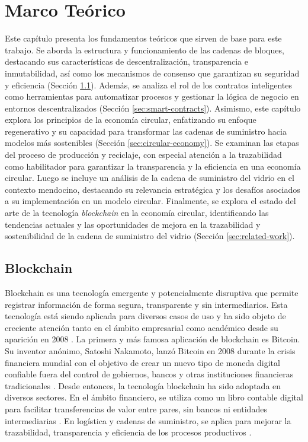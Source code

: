 \chapter[Marco Teórico]{Marco Teórico}
\label{cp:theoretical-framework}

\parindent0pt


Este capítulo presenta los fundamentos teóricos que sirven de base para este trabajo. Se aborda la estructura y funcionamiento de las cadenas de bloques, destacando sus características de descentralización, transparencia e inmutabilidad, así como los mecanismos de consenso que garantizan su seguridad y eficiencia (Sección \ref{sec:blockchain}). Además, se analiza el rol de los contratos inteligentes como herramientas para automatizar procesos y gestionar la lógica de negocio en entornos descentralizados (Sección \ref{sec:smart-contracts}). Asimismo, este capítulo explora los principios de la economía circular, enfatizando su enfoque regenerativo y su capacidad para transformar las cadenas de suministro hacia modelos más sostenibles (Sección \ref{sec:circular-economy}). Se examinan las etapas del proceso de producción y reciclaje, con especial atención a la trazabilidad como habilitador para garantizar la transparencia y la eficiencia en una economía circular. Luego se incluye un análisis de la cadena de suministro del vidrio en el contexto mendocino, destacando su relevancia estratégica y los desafíos asociados a su implementación en un modelo circular. Finalmente, se explora el estado del arte de la tecnología \textit{blockchain} en la economía circular, identificando las tendencias actuales y las oportunidades de mejora en la trazabilidad y sostenibilidad de la cadena de suministro del vidrio (Sección \ref{sec:related-work}).

\section{Blockchain}
\label{sec:blockchain}

Blockchain es una tecnología emergente y potencialmente disruptiva que permite registrar información de forma segura, transparente y sin intermediarios. Esta tecnología está siendo aplicada para diversos casos de uso y ha sido objeto de creciente atención tanto en el ámbito empresarial como académico desde su aparición en 2008 \cite{satoshi2008bitcoin}. La primera y más famosa aplicación de blockchain es Bitcoin. Su inventor anónimo, Satoshi Nakamoto, lanzó Bitcoin en 2008 durante la crisis financiera mundial con el objetivo de crear un nuevo tipo de moneda digital confiable fuera del control de gobiernos, bancos y otras instituciones financieras tradicionales \cite{satoshi2008bitcoin}. Desde entonces, la tecnología blockchain ha sido adoptada en diversos sectores. En el ámbito financiero, se utiliza como un libro contable digital para facilitar transferencias de valor entre pares, sin bancos ni entidades intermediarias \cite{bulkowska2023implementation}. En logística y cadenas de suministro, se aplica para mejorar la trazabilidad, transparencia y eficiencia de los procesos productivos \cite{rejeb2023role}.

